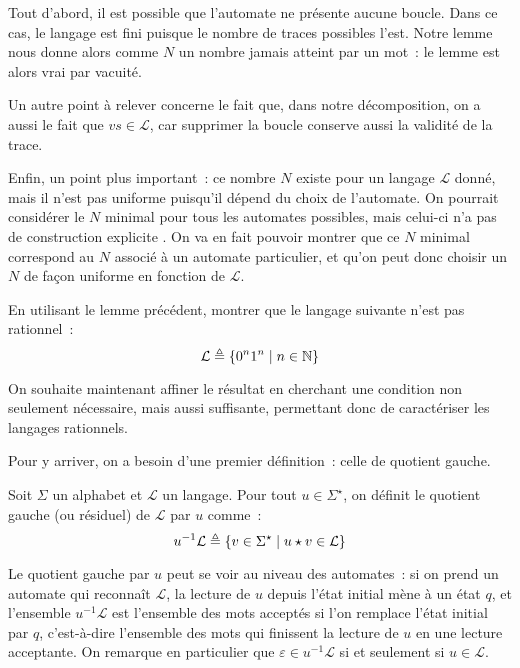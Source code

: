 \begin{remark}
  Tout d'abord, il est possible que l'automate ne présente aucune boucle. Dans
  ce cas, le langage est fini puisque le nombre de traces possibles l'est. Notre
  lemme nous donne alors comme $N$ un nombre jamais atteint par un mot~: le
  lemme est alors vrai par vacuité.

  Un autre point à relever concerne le fait que, dans notre décomposition, on a
  aussi le fait que $vs \in \mathcal L$, car supprimer la boucle conserve aussi
  la validité de la trace.

  Enfin, un point plus important~: ce nombre $N$ existe pour un langage
  $\mathcal L$ donné, mais il n'est pas uniforme puisqu'il dépend du choix de
  l'automate. On pourrait considérer le $N$ minimal pour tous les automates
  possibles, mais celui-ci n'a pas de construction explicite
  . On va en fait pouvoir montrer que ce $N$ minimal
  correspond au $N$ associé à un automate particulier, et qu'on peut donc
  choisir un $N$ de façon uniforme en fonction de $\mathcal L$.
\end{remark}

\begin{exercise}
  En utilisant le lemme précédent, montrer que le langage suivante n'est pas
  rationnel~:
  \[\mathcal L \triangleq \{0^n1^n\mid n \in \mathbb N\}\]
\end{exercise}

On souhaite maintenant affiner le résultat en cherchant une condition non
seulement nécessaire, mais aussi suffisante, permettant donc de caractériser les
langages rationnels.

Pour y arriver, on a besoin d'une premier définition~: celle de quotient gauche.

\begin{definition}
  Soit $\Sigma$ un alphabet et $\mathcal L$ un langage. Pour tout
  $u \in \Sigma^\star$, on définit le quotient gauche (ou résiduel) de
  $\mathcal L$ par $u$ comme~:
  \[u^{-1}\mathcal L\triangleq \{v \in \Sigma^\star\mid u\star v \in \mathcal L\}\]
\end{definition}

Le quotient gauche par $u$ peut se voir au niveau des automates~: si on prend
un automate qui reconnaît $\mathcal L$, la lecture de $u$ depuis l'état
initial mène à un état $q$, et l'ensemble $u^{-1}\mathcal L$ est l'ensemble des
mots acceptés si l'on remplace l'état initial par $q$, c'est-à-dire l'ensemble
des mots qui finissent la lecture de $u$ en une lecture acceptante. On remarque
en particulier que $\varepsilon \in u^{-1}\mathcal L$ si et seulement si
$u \in \mathcal L$.

